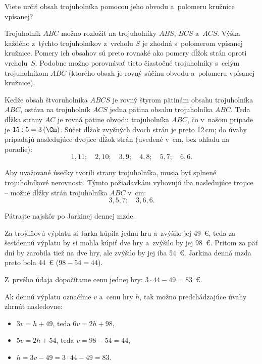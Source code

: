 {%
\napad
Viete určiť obsah trojuholníka pomocou jeho obvodu a~polomeru kružnice vpísanej?

\riesenie
Trojuholník $ABC$ možno rozložiť na trojuholníky $ABS$, $BCS$ a~$ACS$.
Výška každého z~týchto trojuholníkov z~vrcholu $S$ je zhodná s~polomerom vpísanej kružnice.
Pomery ich obsahov sú preto rovnaké ako pomery dĺžok strán oproti vrcholu~$S$.
Podobne možno porovnávať tieto čiastočné trojuholníky s~celým trojuholníkom $ABC$
(ktorého obsah je rovný súčinu obvodu a~polomeru vpísanej kružnice).
%


Keďže obsah štvoruholníka $ABCS$ je rovný štyrom pätinám obsahu trojuholníka $ABC$, ostáva na trojuholník $ACS$ jedna pätina obsahu trojuholníka $ABC$.
Teda dĺžka strany $AC$ je rovná pätine obvodu trojuholníka $ABC$, čo v~našom prípade je ${15:5}=3\,(\Cm)$.
Súčet dĺžok zvyšných dvoch strán je preto 12\,cm; do úvahy pripadajú nasledujúce dvojice dĺžok strán (uvedené v~cm, bez ohľadu na poradie):
$$
1,11;\quad 2, 10;\quad 3,9;\quad 4,8;\quad 5,7;\quad 6,6.
$$

Aby uvažované úsečky tvorili strany trojuholníka, musia byť splnené trojuholníkové nerovnosti.
Týmto požiadavkám vyhovujú iba nasledujúce trojice -- možné dĺžky strán trojuholníka $ABC$ v~cm:
$$
3,5,7;\quad 3,6,6.
$$
}

{%
\napad
Pátrajte najskôr po Jarkinej dennej mzde.

\riesenie
Za trojdňovú výplatu si Jarka kúpila jednu hru a~zvýšilo jej 49~€, teda za šesťdennú výplatu by si mohla kúpiť dve hry a~zvýšilo by jej 98~€.
Pritom za päť dní by zarobila tiež na dve hry, ale zvýšilo by jej iba 54~€.
Jarkina denná mzda preto bola 44~€ ($98-54=44$).

Z~prvého údaja dopočítame cenu jednej hry: $3\cdot44-49=83$~€.

\poznamka
Ak dennú výplatu označíme $v$ a~cenu hry $h$, tak možno predchádzajúce úvahy zhrnúť nasledovne:
\begin{itemize}
\item $3v=h+49$, teda $6v=2h+98$,
\item $5v=2h+54$, teda $v=98-54=44$,
\item $h=3v-49=3\cdot44-49=83$.
\end{itemize}
}

